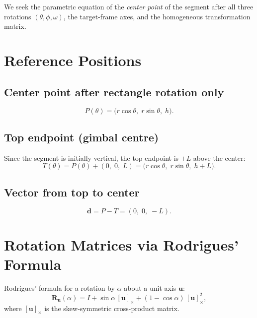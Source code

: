 \documentclass[12pt,a4paper]{article}
\newcommand{\uv}{\mathbf{u}}
\newcommand{\Rd}{\mathbf{R}}
\newcommand{\skewop}[1]{[#1]_\times}
\begin{document}
We seek the parametric equation of the \emph{center point} of the segment after
all three rotations $(\theta,\phi,\omega)$, the target-frame axes, and the
homogeneous transformation matrix.

\section{Reference Positions}

\subsection{Center point after rectangle rotation only}

\[
  P(\theta) = \big( r\cos\theta,\; r\sin\theta,\; h \big).
\]

\subsection{Top endpoint (gimbal centre)}

Since the segment is initially vertical, the top endpoint is $+L$ above the center:
\begin{equation}\label{eq:top}
  T(\theta) = P(\theta) + (0,\; 0,\; L)
            = \big( r\cos\theta,\; r\sin\theta,\; h+L \big).
\end{equation}

\subsection{Vector from top to center}

\begin{equation}\label{eq:d}
  \mathbf{d} = P - T = (0,\; 0,\; -L).
\end{equation}

\section{Rotation Matrices via Rodrigues' Formula}

Rodrigues' formula for a rotation by $\alpha$ about a unit axis $\uv$:
\begin{equation}\label{eq:rodrigues}
  \Rd_{\uv}(\alpha) = I + \sin\alpha\,\skewop{\uv} + (1-\cos\alpha)\,\skewop{\uv}^2,
\end{equation}
where $\skewop{\uv}$ is the skew-symmetric cross-product matrix.
\end{document}
